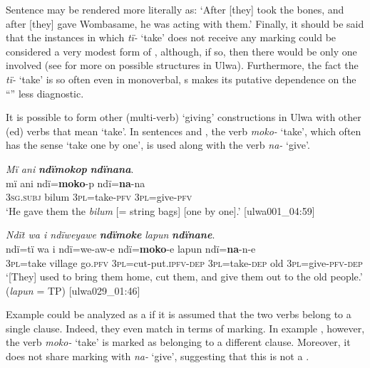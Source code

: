 
Sentence  may be rendered more literally as: ‘After [they] took the bones, and after [they] gave Wombasame, he was acting with them.’ Finally, it should be said that the instances in which \textit{tï-} ‘take’ does not receive any  marking could be considered a very modest form of , although, if so, then there would be only one  involved (see  for more on possible  structures in Ulwa). Furthermore, the fact the \textit{tï-} ‘take’ is so often  even in monoverbal, s makes its putative dependence on the “” less diagnostic.

  It is possible to form other (multi-verb) ‘giving’ constructions in Ulwa with other (ed) verbs that mean ‘take’. In sentences  and , the verb \textit{moko-} ‘take’, which often has the sense ‘take one by one’, is used along with the verb \textit{na-} ‘give’.

  \ea%
    \label{ex:clause:42}
          \textit{Mï ani} \textbf{\textit{ndïmokop}} \textbf{\textit{ndïnana}}.\\
\gll mï      ani    ndï=\textbf{moko}{}-p  ndï=\textbf{na}{}-na\\
    3\textsc{sg.subj}  bilum  3\textsc{pl}=take-\textsc{pfv}  3\textsc{pl}=give-\textsc{pfv}\\
\glt `He gave them the \textit{bilum} [= string bags] [one by one].’ [ulwa001\_04:59]
\z

\ea%
    \label{ex:clause:43}
          \textit{Ndït wa i ndïweyawe} \textbf{\textit{ndïmoke}} \textit{lapun} \textbf{\textit{ndïnane}}.\\
\gll ndï=tï    wa    i    ndï=we-aw-e      ndï=\textbf{moko}{}-e     lapun  ndï=\textbf{na}{}-n-e\\
    3\textsc{pl}=take  village  go.\textsc{pfv}  \textsc{3pl}=cut-put.\textsc{ipfv-dep}  \textsc{3pl=}take\textsc{{}-dep}    old    \textsc{3pl}=give-\textsc{pfv-dep}\\
\glt `[They] used to bring them home, cut them, and give them out to the old people.’ (\textit{lapun} = TP) [ulwa029\_01:46]
\z
  
  Example  could be analyzed as a  if it is assumed that the two verbs belong to a single clause. Indeed, they even match in terms of  marking. In example , however, the verb \textit{moko-} ‘take’ is marked as belonging to a different clause. Moreover, it does not share  marking with \textit{na-} ‘give’, suggesting that this is not a .

